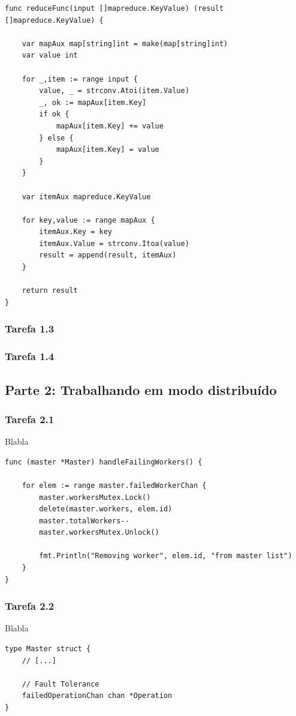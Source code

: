 \documentclass[conference]{IEEEtran}
\begin{document}
\begin{lstlisting}
func reduceFunc(input []mapreduce.KeyValue) (result []mapreduce.KeyValue) {

	var mapAux map[string]int = make(map[string]int)
	var value int

	for _,item := range input {
		value, _ = strconv.Atoi(item.Value)
		_, ok := mapAux[item.Key]
		if ok {
			mapAux[item.Key] += value
		} else {
			mapAux[item.Key] = value
		}
	}

	var itemAux mapreduce.KeyValue

	for key,value := range mapAux {
		itemAux.Key = key
		itemAux.Value = strconv.Itoa(value)
		result = append(result, itemAux)
	}
	
	return result
}
\end{lstlisting}

\subsubsection{Tarefa 1.3}

\subsubsection{Tarefa 1.4}

\subsection{Parte 2: Trabalhando em modo distribuído}

\subsubsection{Tarefa 2.1} Blabla

\begin{lstlisting}
func (master *Master) handleFailingWorkers() {

	for elem := range master.failedWorkerChan {
		master.workersMutex.Lock()
		delete(master.workers, elem.id)
		master.totalWorkers--
		master.workersMutex.Unlock()

		fmt.Println("Removing worker", elem.id, "from master list")
	}
}
\end{lstlisting}

\subsubsection{Tarefa 2.2} Blabla

\begin{lstlisting}
type Master struct {
	// [...]

	// Fault Tolerance
	failedOperationChan chan *Operation
}
\end{lstlisting}
\end{document}
